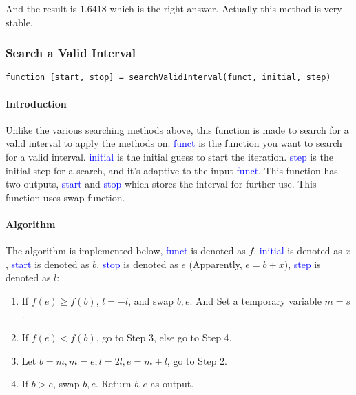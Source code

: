 \documentclass{article}
\begin{document}
And the result is $1.6418$ which is the right answer. Actually this method is very stable.

\subsubsection{Search a Valid Interval}
\begin{verbatim}
function [start, stop] = searchValidInterval(funct, initial, step)
\end{verbatim}

\paragraph{Introduction}
Unlike the various searching methods above, this function is made to search for a valid interval to apply the methods on. \textcolor{blue}{funct} is the function you want to search for a valid interval. \textcolor{blue}{initial} is the initial guess to start the iteration. \textcolor{blue}{step} is the initial step for a search, and it's adaptive to the input \textcolor{blue}{funct}. This function has two outputs, \textcolor{blue}{start} and \textcolor{blue}{stop} which stores the interval for further use. This function uses swap function.

\paragraph{Algorithm}
The algorithm is implemented below, \textcolor{blue}{funct} is denoted as $f$, \textcolor{blue}{initial} is denoted as $x$, \textcolor{blue}{start} is denoted as $b$, \textcolor{blue}{stop} is denoted as $e$ (Apparently, $e = b + x$), \textcolor{blue}{step} is denoted as $l$:
\begin{enumerate}
    \item If $f(e) \geqslant f(b)$, $l = -l$, and swap $b, e$. And Set a temporary variable $m = s$.
    \item If $f(e) < f(b)$, go to Step 3, else go to Step 4.
    \item Let $b = m, m = e, l = 2l, e = m + l$, go to Step 2.
    \item If $b > e$, swap $b, e$. Return $b, e$ as output.
\end{enumerate}
\end{document}

